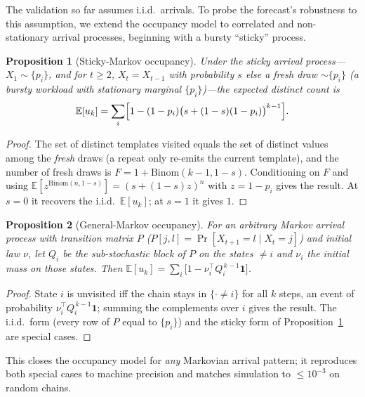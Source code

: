 \documentclass[sigconf,nonacm]{acmart}
\newcommand{\E}{\mathbb{E}}
\newtheorem{prop}{Proposition}
\begin{document}
The validation so far assumes i.i.d.\ arrivals. To probe the forecast's robustness to this assumption, we extend the occupancy model to correlated and non-stationary arrival processes, beginning with a bursty ``sticky'' process.
\begin{prop}[Sticky-Markov occupancy]\label{prop:sticky}
Under the sticky arrival process---$X_1\sim\{p_i\}$, and for $t\ge2$, $X_t{=}X_{t-1}$ with probability $s$ else a fresh draw $\sim\{p_i\}$ (a bursty workload with stationary marginal $\{p_i\}$)---the expected distinct count is
\[
\E[u_k]=\sum_i\Bigl[1-(1-p_i)\bigl(s+(1-s)(1-p_i)\bigr)^{k-1}\Bigr].
\]
\end{prop}
\begin{proof}
The set of distinct templates visited equals the set of distinct values among the \emph{fresh} draws (a repeat only re-emits the current template), and the number of fresh draws is $F=1+\mathrm{Binom}(k-1,1-s)$. Conditioning on $F$ and using $\E[z^{\mathrm{Binom}(n,1-s)}]=(s+(1-s)z)^n$ with $z=1-p_i$ gives the result. At $s{=}0$ it recovers the i.i.d.\ $\E[u_k]$; at $s{=}1$ it gives $1$. \end{proof}

\begin{prop}[General-Markov occupancy]\label{prop:markov}
For an \emph{arbitrary} Markov arrival process with transition matrix $P$ ($P[j,l]=\Pr[X_{t+1}{=}l\mid X_t{=}j]$) and initial law $\nu$, let $Q_i$ be the sub-stochastic block of $P$ on the states $\neq i$ and $\nu_i$ the initial mass on those states. Then
$\E[u_k]=\sum_i\bigl[1-\nu_i^{\!\top} Q_i^{\,k-1}\mathbf 1\bigr]$.
\end{prop}
\begin{proof}
State $i$ is unvisited iff the chain stays in $\{\cdot\neq i\}$ for all $k$ steps, an event of probability $\nu_i^{\!\top}Q_i^{\,k-1}\mathbf 1$; summing the complements over $i$ gives the result. The i.i.d.\ form (every row of $P$ equal to $\{p_i\}$) and the sticky form of Proposition~\ref{prop:sticky} are special cases. \end{proof}
\noindent This closes the occupancy model for \emph{any} Markovian arrival pattern; it reproduces both special cases to machine precision and matches simulation to $\le10^{-3}$ on random chains.
\end{document}

